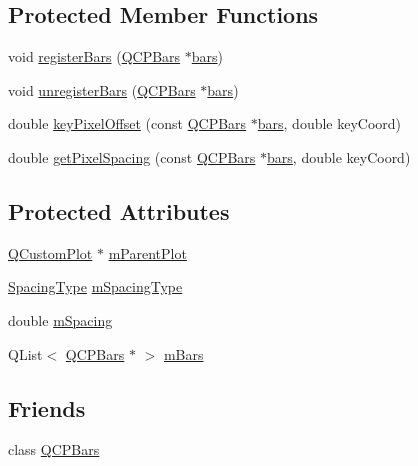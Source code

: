 \subsection*{Protected Member Functions}
\begin{DoxyCompactItemize}
\item 
void \hyperlink{classQCPBarsGroup_a7b00514f19ad58d0bb3fd5246a67fae2}{register\+Bars} (\hyperlink{classQCPBars}{Q\+C\+P\+Bars} $\ast$\hyperlink{classQCPBarsGroup_a7c72ed1f8cd962c93b8c42ab96cd91ec}{bars})
\item 
void \hyperlink{classQCPBarsGroup_ac7073cdd7b1a40c6cb4b5f908145f8c4}{unregister\+Bars} (\hyperlink{classQCPBars}{Q\+C\+P\+Bars} $\ast$\hyperlink{classQCPBarsGroup_a7c72ed1f8cd962c93b8c42ab96cd91ec}{bars})
\item 
double \hyperlink{classQCPBarsGroup_a8e2ca6002e7bab49670144d048a2bcc9}{key\+Pixel\+Offset} (const \hyperlink{classQCPBars}{Q\+C\+P\+Bars} $\ast$\hyperlink{classQCPBarsGroup_a7c72ed1f8cd962c93b8c42ab96cd91ec}{bars}, double key\+Coord)
\item 
double \hyperlink{classQCPBarsGroup_a0beccd41bc3841a4c5b284823bc7d2de}{get\+Pixel\+Spacing} (const \hyperlink{classQCPBars}{Q\+C\+P\+Bars} $\ast$\hyperlink{classQCPBarsGroup_a7c72ed1f8cd962c93b8c42ab96cd91ec}{bars}, double key\+Coord)
\end{DoxyCompactItemize}
\subsection*{Protected Attributes}
\begin{DoxyCompactItemize}
\item 
\hyperlink{classQCustomPlot}{Q\+Custom\+Plot} $\ast$ \hyperlink{classQCPBarsGroup_a973d408cfbf88db95115aec71877f9e7}{m\+Parent\+Plot}
\item 
\hyperlink{classQCPBarsGroup_a4c0521120a97e60bbca37677a37075b6}{Spacing\+Type} \hyperlink{classQCPBarsGroup_a6794ee1a9c81864d627bff6a4b2d64ec}{m\+Spacing\+Type}
\item 
double \hyperlink{classQCPBarsGroup_a56471d7f548ca6141b7a5bf9629f7ece}{m\+Spacing}
\item 
Q\+List$<$ \hyperlink{classQCPBars}{Q\+C\+P\+Bars} $\ast$ $>$ \hyperlink{classQCPBarsGroup_affdb1e9233c277ff5a4c0a1121cf1fc0}{m\+Bars}
\end{DoxyCompactItemize}
\subsection*{Friends}
\begin{DoxyCompactItemize}
\item 
class \hyperlink{classQCPBarsGroup_a721b87c7cdb8e83a90d77fc8a22e7195}{Q\+C\+P\+Bars}
\end{DoxyCompactItemize}


